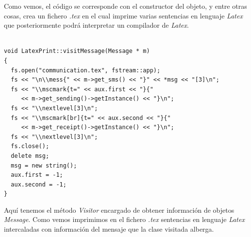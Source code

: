 Como vemos, el código se corresponde con el constructor del objeto, y
entre otras cosas, crea un fichero \textit{.tex} en el cual imprime
varias sentencias en lenguaje \textit{Latex} que posteriormente podrá
interpretar un compilador de \textit{Latex}.

\begin{lstlisting}

void LatexPrint::visitMessage(Message * m)
{
  fs.open("communication.tex", fstream::app);
  fs << "\n\\mess{" << m->get_sms() << "}" << *msg << "[3]\n";
  fs << "\\mscmark{t=" << aux.first << "}{" 
     << m->get_sending()->getInstance() << "}\n";
  fs << "\\nextlevel[3]\n";
  fs << "\\mscmark[br]{t=" << aux.second << "}{" 
     << m->get_receipt()->getInstance() << "}\n";
  fs << "\\nextlevel[3]\n";
  fs.close();
  delete msg;
  msg = new string();
  aux.first = -1;
  aux.second = -1;
}

\end{lstlisting}

Aquí tenemos el método \textit{Visitor} encargado de obtener
información de objetos \textit{Message}. Como vemos imprimimos en el
fichero \textit{.tex} sentencias en lenguaje \textit{Latex}
intercaladas con información del mensaje que la clase visitada
alberga.


